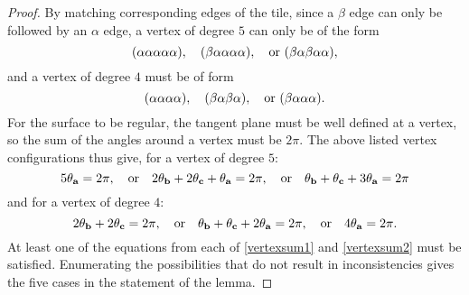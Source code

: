 \documentclass[11pt]{amsart}
\newcommand{\tA}{\mathbf{\theta_a}}
\newcommand{\tB}{\mathbf{\theta_b}}
\newcommand{\tC}{\mathbf{\theta_c}}
\newcommand{\beq}{\begin{equation}}
\newcommand{\eeq}{\end{equation}}
\theoremstyle{remark}
\newcounter{case}
\begin{document}
\begin{proof}
  By matching corresponding edges of the tile, since a $\beta$ edge can only be followed by an $\alpha$ edge,  a vertex of degree $5$ can only be 
of the form 
\[
(\alpha \alpha \alpha \alpha \alpha), \quad (\beta \alpha \alpha \alpha \alpha), \quad \hbox{or }
(\beta \alpha \beta \alpha \alpha),
\] 
and
a vertex of degree $4$ must be of form 
\[
(\alpha \alpha \alpha \alpha), \quad (\beta \alpha \beta \alpha), \quad 
\hbox{or } (\beta \alpha \alpha \alpha).
\]
For the surface to be regular, the tangent plane must be well defined at a vertex, so the sum of the
angles around a vertex must be $2\pi$.  The above listed vertex configurations thus give, for a vertex of  degree $5$:
\beq \label{vertexsum1}
5\tA = 2\pi, \quad \hbox{or} \quad 2\tB+2\tC+\tA = 2\pi, \quad \hbox{or} \quad
\tB+\tC+3\tA=2\pi
\eeq 
and for a vertex of degree $4$:
\beq \label{vertexsum2}
 2\tB+2\tC=2\pi, \quad \hbox{or} \quad  \tB+\tC+2\tA=2\pi, \quad \hbox{or} \quad  4\tA =2\pi.
\eeq
At least one of the equations from each of \eqref{vertexsum1} and \eqref{vertexsum2} must be 
satisfied.   Enumerating the possibilities that do not result in inconsistencies gives the five cases in 
the statement of the lemma.
\end{proof}
\end{document}
